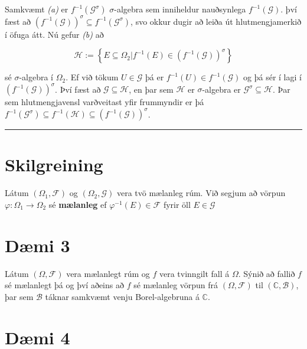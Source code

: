 \documentclass[]{book}
\begin{document}
Samkvæmt \emph{(a)} er \(f^{-1}(\mathcal G^\sigma)\) \(\sigma\)-algebra sem inniheldur nauðsynlega \(f^{-1}(\mathcal G)\). því fæst að \((f^{-1}(\mathcal G))^\sigma \subseteq f^{-1}(\mathcal G^\sigma)\), svo okkur dugir að leiða út hlutmengjamerkið í öfuga átt. Nú gefur \emph{(b)} að

\[
\mathcal H := \left\{E\subseteq \Omega_2 | f^{-1}(E)\in(f^{-1}(\mathcal G))^\sigma\right\}
\]

sé \(\sigma\)-algebra í \(\Omega_2\). Ef við tökum \(U\in\mathcal G\) þá er \(f^{-1}(U)\in f^{-1}(\mathcal G)\) og þá sér í lagi í \((f^{-1}(\mathcal G))^\sigma\). Því fæst að \(\mathcal G \subseteq \mathcal H\), en þar sem \(\mathcal H\) er \(\sigma\)-algebra er \(\mathcal G^\sigma \subseteq \mathcal H\). Þar sem hlutmengjavensl varðveitast yfir frummyndir er þá \(f^{-1}(\mathcal G^\sigma) \subseteq f^{-1}(\mathcal H) \subseteq (f^{-1}(\mathcal G))^\sigma\).

\begin{center}\rule{0.5\linewidth}{\linethickness}\end{center}

\hypertarget{skilgreining-23}{%
\section*{Skilgreining}\label{skilgreining-23}}

Látum \((\Omega_1, \mathcal F)\) og \((\Omega_2, \mathcal G)\) vera tvö mælanleg rúm. Við segjum að vörpun \(\varphi: \Omega_1 \rightarrow \Omega_2\) sé \textbf{mælanleg} ef \(\varphi^{-1}(E) \in \mathcal F\) fyrir öll \(E\in\mathcal G\)

\hypertarget{dmi-3-4}{%
\section*{Dæmi 3}\label{dmi-3-4}}

Látum \((\Omega, \mathcal F)\) vera mælanlegt rúm og \(f\) vera tvinngilt fall á \(\Omega\). Sýnið að fallið \(f\) sé mælanlegt þá og því aðeins að \(f\) sé mælanleg vörpun frá \((\Omega, \mathcal F)\) til \((\mathbb C, \mathcal B)\), þar sem \(\mathcal B\) táknar samkvæmt venju Borel-algebruna á \(\mathbb C\).

\hypertarget{dmi-4-4}{%
\section*{Dæmi 4}\label{dmi-4-4}}
\end{document}

